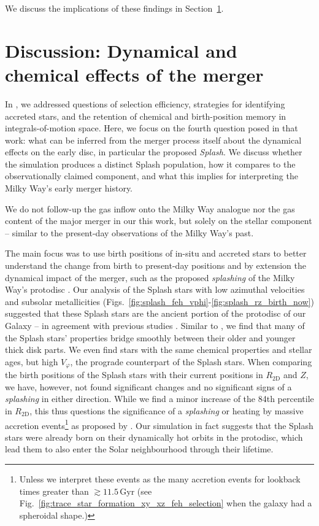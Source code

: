 \documentclass[fleqn,usenatbib]{mnras}
\begin{document}
We discuss the implications of these findings in Section~\ref{sec:discussion}.

\section{Discussion: Dynamical and chemical effects of the merger}
\label{sec:discussion}

In , we addressed questions of selection efficiency, strategies for identifying accreted stars, and the retention of chemical and birth-position memory in integrals-of-motion space. Here, we focus on the fourth question posed in that work: what can be inferred from the merger process itself about the dynamical effects on the early disc, in particular the proposed \textit{Splash}. We discuss whether the simulation produces a distinct Splash population, how it compares to the observationally claimed component, and what this implies for interpreting the Milky Way’s early merger history.

We do not follow-up the gas inflow onto the Milky Way analogue nor the gas content of the major merger \citep[see for example][]{Agertz2021, Renaud2021b, Buck2023} in our this work,  but solely on the stellar component -- similar to the present-day observations of the Milky Way's past.

The main focus was to use birth positions of in-situ and accreted stars to better understand the change from birth to present-day positions and by extension the dynamical impact of the merger, such as the proposed \textit{splashing} of the Milky Way's protodisc \citep{Belokurov2020}. Our analysis of the Splash stars with low azimuthal velocities and subsolar metallicities (Figs.~\ref{fig:splash_feh_vphi}-\ref{fig:splash_rz_birth_now}) suggested that these Splash stars are the ancient portion of the protodisc of our Galaxy -- in agreement with previous studies \citep{Bonaca2017, Haywood2018, DiMatteo2019, Gallart2019, Belokurov2020}. Similar to \citet{Belokurov2020}, we find that many of the Splash stars' properties bridge smoothly between their older and younger thick disk parts. We even find stars with the same chemical properties and stellar ages, but high $V_\varphi$, the prograde counterpart of the Splash stars. When comparing the birth positions of the Splash stars with their current positions in $R_\mathrm{2D}$ and $Z$, we have, however, not found significant changes and no significant signs of a \textit{splashing} in either direction. While we find a minor increase of the 84th percentile in $R_\mathrm{2D}$, this thus questions the significance of a \textit{splashing} or heating by massive accretion events\footnote{Unless we interpret these events as the many accretion events for lookback times greater than $\gtrsim 11.5\,\mathrm{Gyr}$ (see Fig.~\ref{fig:trace_star_formation_xy_xz_feh_selection} when the galaxy had a spheroidal shape.)} as proposed by \citet{Belokurov2020}. Our simulation in fact suggests that the Splash stars were already born on their dynamically hot orbits in the protodisc, which lead them to also enter the Solar neighbourhood through their lifetime.
\end{document}
